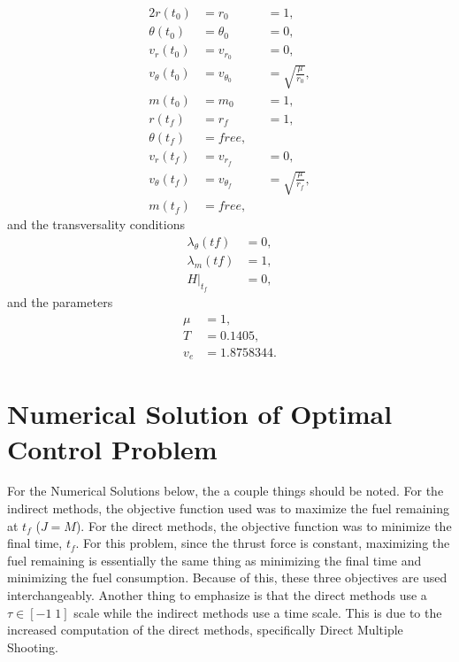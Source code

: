 \documentclass[]{article}
\begin{document}
\begin{alignat*}{2}                                                                                                                                                                        
r(t_0)          &= r_0          &  &= 1, \\
\theta(t_0)     &= \theta_0     &  &= 0, \\
v_r(t_0)        &= v_{r_0}      &  &= 0, \\
v_{\theta}(t_0) &= v_{\theta_0} &  &= \sqrt{\frac{\mu}{r_0}}, \\
m(t_0)          &= m_0          &  &= 1,\\
r(t_f)          &= r_f          &  &= 1,\\
\theta(t_f)     &= free,        &  & \\
v_r(t_f)        &= v_{r_f}      &  &= 0, \\
v_{\theta}(t_f) &= v_{\theta_f} &  &=\sqrt{\frac{\mu}{r_f}},\\
m(t_f)          &= free,         &  & 
\end{alignat*}
and the transversality conditions
\begin{align*}
	\lambda_\theta(tf) &= 0, \\
	\lambda_m(tf) &= 1, \\
	H|_{t_f}   &= 0,
\end{align*}
and the parameters
\begin{align*}
	\mu &= 1, \\
	T   &= 0.1405, \\
	v_e &= 1.8758344.
\end{align*}

\section{Numerical Solution of Optimal Control Problem}
For the Numerical Solutions below, the a couple things should be noted. For the indirect methods, the objective function used was to maximize the fuel remaining at \(t_f\) (\(J = M\)). For the direct methods, the objective function was to minimize the final time, \(t_f\). For this problem, since the thrust force is constant, maximizing the fuel remaining is essentially the same thing as minimizing the final time and minimizing the fuel consumption. Because of this, these three objectives are used interchangeably. Another thing to emphasize is that the direct methods use a \(\tau \in [-1\; 1]\) scale while the indirect methods use a time scale. This is due to the increased computation of the direct methods, specifically Direct Multiple Shooting.
\end{document}
